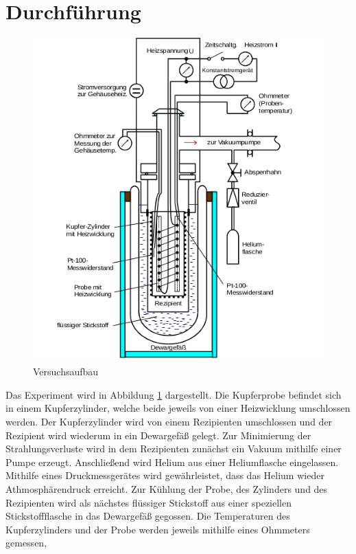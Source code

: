 \section{Durchführung}
\label{sec:Durchführung}
\begin{figure}
  \includegraphics[width=\textwidth]{Bilder_Plots/Aufbau.png}
  \caption{Versuchsaufbau\cite{V47}}
    \label{fig:Aufbau}
\end{figure}
Das Experiment wird in Abbildung \ref{fig:Aufbau} dargestellt.
Die Kupferprobe befindet sich in einem Kupferzylinder, welche beide
jeweils von einer Heizwicklung umschlossen werden.
Der Kupferzylinder wird von einem Rezipienten umschlossen
und der Rezipient wird wiederum in ein Dewargefäß gelegt.
Zur Minimierung der Strahlungsverluste wird in dem
Rezipienten zunächst ein Vakuum mithilfe einer Pumpe erzeugt.
Anschließend wird Helium aus einer Heliumflasche eingelassen.
Mithilfe eines Druckmessgerätes wird gewährleistet, dass das Helium wieder Athmosphärendruck erreicht.
Zur Kühlung der Probe, des Zylinders und des Rezipienten wird als nächstes flüssiger Stickstoff
aus einer speziellen Stickstoffflasche in das Dewargefäß gegossen.
Die Temperaturen des Kupferzylinders und der Probe werden jeweils mithilfe eines Ohmmeters gemessen,
